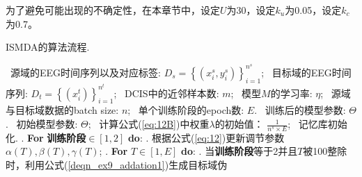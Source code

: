 为了避免可能出现的不确定性，在本章节中，设定$U$为30，设定${k}_{u}$为0.05，设定${k}_{c}$为0.7。

\begin{algorithm}[!h]
\small
\setcounter{algorithm}{0}
\caption{\small{ISMDA的算法流程.}}\label{alg:alg1}
\begin{algorithmic}
\STATE 
{}\ 源域的EEG时间序列以及对应标签: $ D_{s}=\left\{\left(x_{i}^{s}, y_{i}^{s}\right)\right\}_{i=1}^{n^{s}}$;
\vspace{0.22cm}
\STATE \hspace{0.90cm}\ 目标域的EEG时间序列: $ D_{t}=\left\{\left(x_{i}^{t}\right)\right\}_{i=1}^{n^{t}}$;
\vspace{0.22cm}
\STATE \hspace{0.90cm}\ DCIS中的近邻样本数: $m$;
\vspace{0.22cm}
\STATE \hspace{0.90cm}\ 模型$M$的学习率: $\eta$;
\vspace{0.22cm}
\STATE \hspace{0.90cm}\ 源域与目标域数据的batch size: $n$;
\vspace{0.22cm}
\STATE \hspace{0.90cm}\ 单个训练阶段的epoch数:  $E$.
\vspace{0.22cm}
\ 训练后的模型参数: $\Theta$.
\vspace{0.22cm}
\ 初始模型参数:  $\Theta$;
\vspace{0.22cm}
\STATE \hspace{1.3cm}\ 计算公式(\ref{eq:12B})中权重$\lambda$的初始值： $\frac{1}{n^{s} \times E}$;
\vspace{0.22cm}
\STATE \hspace{1.3cm}\ 记忆库初始化. 
\vspace{0.22cm}
. \textbf{For} \textbf{训练阶段}$\in[1,2]$ \textbf{do}:
\vspace{0.22cm}
. \hspace{0.4cm}根据公式(\ref{eq:12})更新调节参数 $\alpha(T), \beta(T), \gamma(T)$;
\vspace{0.22cm}
. \hspace{0.4cm}\textbf{For} $T \in[1, E]$ \textbf{do}:
\vspace{0.22cm}
. \hspace{0.8cm}当\textbf{训练阶段}等于2并且\textbf{$T$}被100整除时，利用公式(\ref{deqn_ex9_addation1})生成目标域伪
\vspace{0.22cm}

\end{algorithmic}
\end{algorithm}
